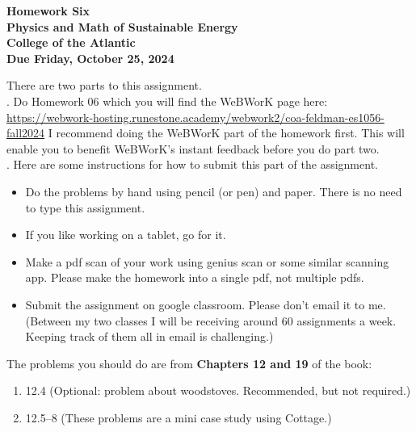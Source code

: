 \documentclass[12pt]{article}
\begin{document}
\pagestyle{empty}
 
\begin{center}
{\LARGE {\bf Homework Six}}\\
\bigskip
{\Large {\bf Physics and Math of Sustainable Energy}}\\
\bigskip
{\Large {\bf College of the Atlantic}}\\
\bigskip
{ {\bf Due Friday, October 25, 2024}}\\ 
\end{center}
\medskip


\noindent There are two parts to this assignment.\\

.  Do Homework 06 which you
will find the WeBWorK page here:
\url{https://webwork-hosting.runestone.academy/webwork2/coa-feldman-es1056-fall2024}
I recommend doing the WeBWorK part of the homework first.  This will
enable you to benefit WeBWorK's instant feedback before you do part
two.\\ 


.  Here are some
instructions for how to submit this part of the assignment.
\begin{itemize}
\item Do the problems by hand using pencil (or pen) and paper.
  There is no need to type this assignment.
\item If you like working on a tablet, go for it. 
\item Make a pdf scan of your work using genius scan or some
  similar scanning app.  Please make the homework into a single
  pdf, not multiple pdfs.
\item Submit the assignment on google classroom.  Please don't
  email it to me.  (Between my two classes I will be receiving
  around 60 assignments a week.  Keeping track of them all in email 
  is challenging.)\\
\end{itemize}



\noindent The problems you should do are from {\bf Chapters 12 and 19} of the book:  \\ 

\begin{enumerate}
  \setlength{\itemsep}{-1mm}
  \item 12.4 (Optional: problem about woodstoves. Recommended, but not required.)
  \item 12.5–8 (These problems are a mini case study using Cottage.)\\
\end{enumerate}
\end{document}
